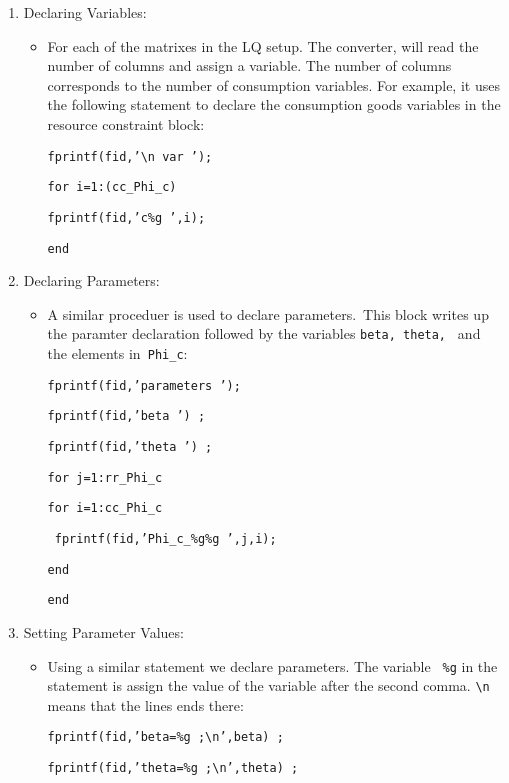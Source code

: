 \documentclass[letter, fleqn, 11pt]{article}
\begin{document}
\begin{enumerate}
\item Declaring Variables:

\begin{itemize}
\item For each of the matrixes in the LQ setup. The converter, will read the
number of columns and assign a variable. The number of columns corresponds
to the number of consumption variables. For example, it uses the following
statement to declare the consumption goods variables in the resource
constraint block:

\texttt{fprintf(fid,'\textbackslash n var ');}

\texttt{for i=1:(cc\_Phi\_c)}

\texttt{\qquad fprintf(fid,'c\%g ',i);}

\texttt{end}
\end{itemize}

\item Declaring Parameters:

\begin{itemize}
\item A similar proceduer is used to declare parameters.\ This block writes
up the paramter declaration followed by the variables \texttt{beta, theta, }%
and the elements in\texttt{\ Phi\_c}:

\texttt{fprintf(fid,'parameters ');}

\texttt{fprintf(fid,'beta ') ;}

\texttt{fprintf(fid,'theta ') ;}

\texttt{for j=1:rr\_Phi\_c}

\qquad \texttt{for i=1:cc\_Phi\_c}

\texttt{\ \qquad \qquad fprintf(fid,'Phi\_c\_\%g\%g ',j,i);}

\qquad \texttt{end}

\texttt{end}
\end{itemize}

\item Setting Parameter Values:

\begin{itemize}
\item Using a similar statement we declare parameters. The variable \texttt{%
\%g} in the statement is assign the value of the variable after the second comma. \texttt{\textbackslash n }means that the lines ends
there:

\texttt{fprintf(fid,'beta=\%g ;\textbackslash n',beta) ;}

\texttt{fprintf(fid,'theta=\%g ;\textbackslash n',theta) ;}


\end{itemize}
\end{enumerate}
\end{document}
